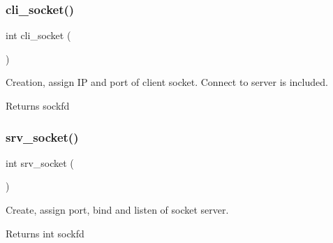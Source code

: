 \subsubsection{cli\+\_\+socket()}
{\footnotesize\ttfamily int cli\+\_\+socket (\begin{DoxyParamCaption}{ }\end{DoxyParamCaption})}



Creation, assign IP and port of client socket. Connect to server is included. 

\begin{DoxyReturn}{Returns}
sockfd 
\end{DoxyReturn}
\mbox{\label{socket_8c_abaa85d7aff16c338adf9a408c151bc28}} 
\subsubsection{srv\+\_\+socket()}
{\footnotesize\ttfamily int srv\+\_\+socket (\begin{DoxyParamCaption}{ }\end{DoxyParamCaption})}



Create, assign port, bind and listen of socket server. 

\begin{DoxyReturn}{Returns}
int sockfd 
\end{DoxyReturn}

